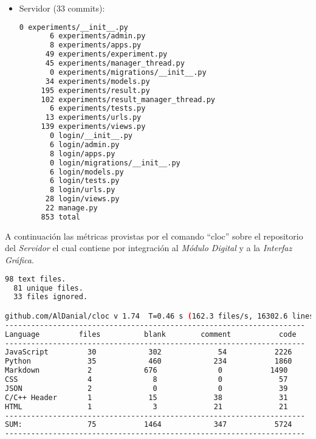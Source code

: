 \begin{itemize}
\item Servidor (33 commits):
    \begin{lstlisting}[language=bash]
       0 experiments/__init__.py
       6 experiments/admin.py
       8 experiments/apps.py
      49 experiments/experiment.py
      45 experiments/manager_thread.py
       0 experiments/migrations/__init__.py
      34 experiments/models.py
     195 experiments/result.py
     102 experiments/result_manager_thread.py
       6 experiments/tests.py
      13 experiments/urls.py
     139 experiments/views.py
       0 login/__init__.py
       6 login/admin.py
       8 login/apps.py
       0 login/migrations/__init__.py
       6 login/models.py
       6 login/tests.py
       8 login/urls.py
      28 login/views.py
      22 manage.py
     853 total
    \end{lstlisting}
\end{itemize}
\newpage

A continuaci\'on las m\'etricas provistas por el comando \enquote{cloc} sobre el
repositorio del \textit{Servidor} el cual contiene por integraci\'on al \textit{M\'odulo Digital}
y a la \textit{Interfaz Gr\'afica}.

\begin{lstlisting}[language=bash]
  98 text files.
  81 unique files.                              
  33 files ignored.

github.com/AlDanial/cloc v 1.74  T=0.46 s (162.3 files/s, 16302.6 lines/s)
---------------------------------------------------------------------
Language         files          blank        comment           code
---------------------------------------------------------------------
JavaScript         30            302             54           2226
Python             35            460            234           1860
Markdown           2            676              0           1490
CSS                4              8              0             57
JSON               2              0              0             39
C/C++ Header       1             15             38             31
HTML               1              3             21             21
---------------------------------------------------------------------
SUM:               75           1464            347           5724
---------------------------------------------------------------------
\end{lstlisting}
\newpage
